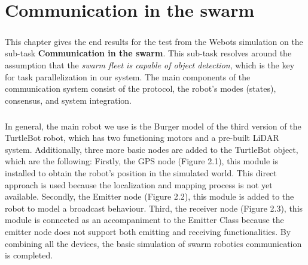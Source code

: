 \chapter{Communication in the swarm}

\paragraph*{}
This chapter gives the end results for the test from the Webots simulation on the sub-task \textbf{Communication in the swarm}. This sub-task resolves around the assumption that the \textit{swarm fleet is capable of object detection}, which is the key for task parallelization in our system. The main components of the communication system consist of the protocol, the robot's modes (states), consensus, and system integration.

\paragraph*{}
In general, the main robot we use is the Burger model of the third version of the TurtleBot robot, which has two functioning motors and a pre-built LiDAR system. Additionally, three more basic nodes are added to the TurtleBot object, which are the following: Firstly, the GPS node (Figure 2.1), this module is installed to obtain the robot’s position in the simulated world. This direct approach is used because the localization and mapping process is not yet available. Secondly, the Emitter node (Figure 2.2), this module is added to the robot to model a broadcast behaviour. Third, the receiver node (Figure 2.3), this module is connected as an accompaniment to the Emitter Class because the emitter node does not support both emitting and receiving functionalities. By combining all the devices, the basic simulation of swarm robotics communication is completed.

